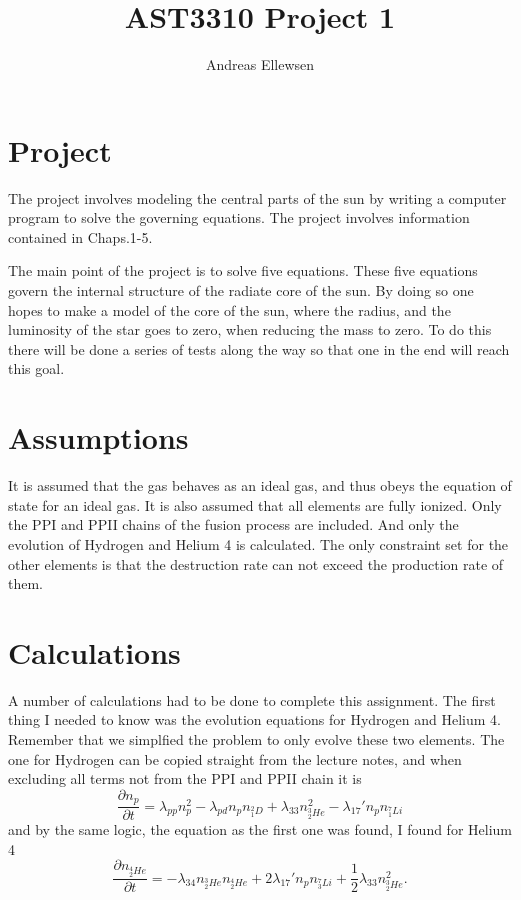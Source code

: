\documentclass[a4paper,12pt]{article}
\title{AST3310 Project 1}
\author{Andreas Ellewsen}
\begin{document}
\maketitle
\tableofcontents
\newpage
\section{Project}
The project involves modeling the central parts of the sun by
writing a computer program to solve the governing equations. The project
involves information contained in Chaps.1-5.

The main point of the project is to solve five equations.
These five equations govern the internal structure of the radiate core of the sun.
By doing so one hopes to make a model of the core of the sun, where the radius, and the luminosity of the star goes to zero, when reducing the mass to zero.
To do this there will be done a series of tests along the way so that one in the end will reach this goal.

\section{Assumptions}
It is assumed that the gas behaves as an ideal gas, and thus obeys the equation of state for an ideal gas.
It is also assumed that all elements are fully ionized.
Only the PPI and PPII chains of the fusion process are included.
And only the evolution of Hydrogen and Helium 4 is calculated.
The only constraint set for the other elements is that the destruction rate can not exceed the production rate of them.

\section{Calculations}
A number of calculations had to be done to complete this assignment.
The first thing I needed to know was the evolution equations for Hydrogen and Helium 4. 
Remember that we simplfied the problem to only evolve these two elements.
The one for Hydrogen can be copied straight from the lecture notes, and when excluding all terms not from the PPI and PPII chain it is
\begin{equation}
\frac{\partial n_p}{\partial t} = \lambda_{pp}n_p^2 - \lambda_{pd} n_pn_{^2_1D} + \lambda_{33} n_{^3_2He}^2 - \lambda_{17}' n_p n_{^7_1Li} 
\end{equation}
and by the same logic, the equation as the first one was found, I found for Helium 4
\begin{equation}
\frac{\partial n_{^4_2He}}{\partial t} = -\lambda_{34}n_{^3_2He}n_{^4_2He} + 2\lambda_{17}' n_p n_{^7_3Li} + \frac{1}{2}\lambda_{33} n_{^3_2He}^2.
\end{equation}
\end{document}
